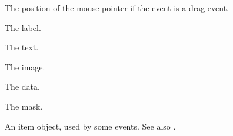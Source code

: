 The position of the mouse pointer if the event is a drag event.


\label{wxlisteventgetlabel}


The label.

\label{wxlisteventgettext}


The text.

\label{wxlisteventgetimage}


The image.

\label{wxlisteventgetdata}


The data.

\label{wxlisteventgetmask}


The mask.

\label{wxlisteventgetitem}


An item object, used by some events. See also .



